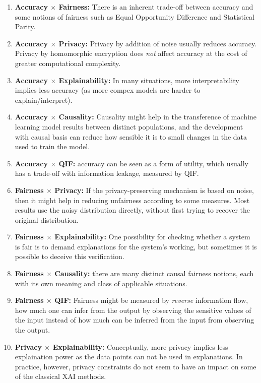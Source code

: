 \documentclass[conference]{IEEEtran}
\begin{document}
\begin{enumerate}
    \item \textbf{Accuracy $\times$ Fairness:} There is an inherent trade-off between accuracy and some notions of fairness such as Equal Opportunity Difference and Statistical Parity.
    \item \textbf{Accuracy $\times$ Privacy:} Privacy by addition of noise usually reduces accuracy. Privacy by homomorphic encryption does \emph{not} affect accuracy at the cost of greater computational complexity.
    \item \textbf{Accuracy $\times$ Explainability:} In many situations, more interpretability implies less accuracy (as more compex models are harder to explain/interpret).
    \item \textbf{Accuracy $\times$ Causality:} Causality might help in the transference of machine learning model results between distinct populations, and the development with causal basis can reduce how sensible it is to small changes in the data used to train the model.
    \item \textbf{Accuracy $\times$ QIF:} accuracy can be seen as a form of utility, which usually has a trade-off with information leakage, measured by QIF.
    \item \textbf{Fairness $\times$ Privacy:} If the privacy-preserving mechanism is based on noise, then it might help in reducing unfairness according to some measures. Most results use the noisy distribution directly, without first trying to recover the original distribution.
    \item \textbf{Fairness $\times$ Explainability:} One possibility for checking whether a system is fair is to demand explanations for the system's working, but sometimes it is possible to deceive this verification.
    \item \textbf{Fairness $\times$ Causality:} there are many distinct causal fairness notions, each with its own meaning and class of applicable situations.
    \item \textbf{Fairness $\times$ QIF:} Fairness might be measured by \emph{reverse} information flow, how much one can infer from the output by observing the sensitive values of the input instead of how much can be inferred from the input from observing the output.
    \item \textbf{Privacy $\times$ Explainability:} Conceptually, more privacy implies less explaination power as the data points can not be used in explanations. In practice, however, privacy constraints do not seem to have an impact on some of the classical XAI methods.

\end{enumerate}
\end{document}
